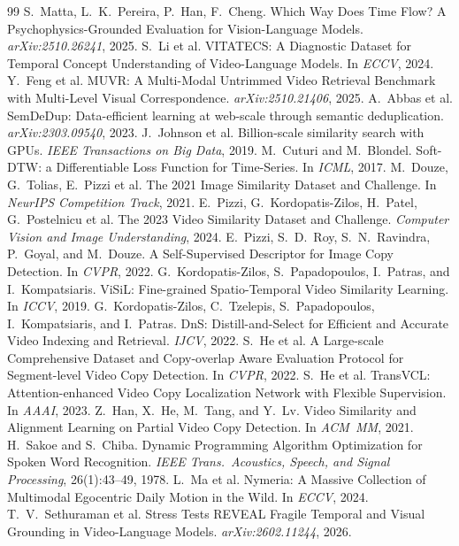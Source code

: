 \documentclass{article}
\theoremstyle{remark}
\begin{document}
\begin{thebibliography}{99}
 S.~Matta, L.~K.~Pereira, P.~Han, F.~Cheng. Which Way Does Time Flow? A Psychophysics-Grounded Evaluation for Vision-Language Models. \emph{arXiv:2510.26241}, 2025.
 S.~Li et al. VITATECS: A Diagnostic Dataset for Temporal Concept Understanding of Video-Language Models. In \emph{ECCV}, 2024.
 Y.~Feng et al. MUVR: A Multi-Modal Untrimmed Video Retrieval Benchmark with Multi-Level Visual Correspondence. \emph{arXiv:2510.21406}, 2025.
 A.~Abbas et al. SemDeDup: Data-efficient learning at web-scale through semantic deduplication. \emph{arXiv:2303.09540}, 2023.
 J.~Johnson et al. Billion-scale similarity search with GPUs. \emph{IEEE Transactions on Big Data}, 2019.
 M.~Cuturi and M.~Blondel. Soft-{DTW}: a Differentiable Loss Function for Time-Series. In \emph{ICML}, 2017.
 M.~Douze, G.~Tolias, E.~Pizzi et al. The 2021 Image Similarity Dataset and Challenge. In \emph{NeurIPS Competition Track}, 2021.
 E.~Pizzi, G.~Kordopatis-Zilos, H.~Patel, G.~Postelnicu et al. The 2023 Video Similarity Dataset and Challenge. \emph{Computer Vision and Image Understanding}, 2024.
 E.~Pizzi, S.~D.~Roy, S.~N.~Ravindra, P.~Goyal, and M.~Douze. A Self-Supervised Descriptor for Image Copy Detection. In \emph{CVPR}, 2022.
 G.~Kordopatis-Zilos, S.~Papadopoulos, I.~Patras, and I.~Kompatsiaris. ViSiL: Fine-grained Spatio-Temporal Video Similarity Learning. In \emph{ICCV}, 2019.
 G.~Kordopatis-Zilos, C.~Tzelepis, S.~Papadopoulos, I.~Kompatsiaris, and I.~Patras. DnS: Distill-and-Select for Efficient and Accurate Video Indexing and Retrieval. \emph{IJCV}, 2022.
 S.~He et al. A Large-scale Comprehensive Dataset and Copy-overlap Aware Evaluation Protocol for Segment-level Video Copy Detection. In \emph{CVPR}, 2022.
 S.~He et al. TransVCL: Attention-enhanced Video Copy Localization Network with Flexible Supervision. In \emph{AAAI}, 2023.
 Z.~Han, X.~He, M.~Tang, and Y.~Lv. Video Similarity and Alignment Learning on Partial Video Copy Detection. In \emph{ACM~MM}, 2021.
 H.~Sakoe and S.~Chiba. Dynamic Programming Algorithm Optimization for Spoken Word Recognition. \emph{IEEE Trans.\ Acoustics, Speech, and Signal Processing}, 26(1):43--49, 1978.
 L.~Ma et al. Nymeria: A Massive Collection of Multimodal Egocentric Daily Motion in the Wild. In \emph{ECCV}, 2024.
 T.~V.~Sethuraman et al. Stress Tests REVEAL Fragile Temporal and Visual Grounding in Video-Language Models. \emph{arXiv:2602.11244}, 2026.

\end{thebibliography}
\end{document}
